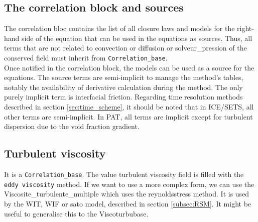 \subsection{The correlation block and sources}
The correlation bloc contains the list of all closure laws and models for the right-hand side of the equation that can be used in the equations as sources. Thus, all terms that are not related to {\color{codekeyword3} convection} or {\color{codekeyword3} diffusion} or {\color{codekeyword3} solveur_pression} of the conserved field must inherit from \texttt{Correlation_base}.\\
Once notified in the correlation block, the models can be used as a source for the equations. The source terms are semi-implicit to manage the method's tables, notably the availability of derivative calculation during the method. The only purely implicit term is interfacial friction. Regarding time resolution methods described in section \ref{sec:time_scheme}, it should be noted that in ICE/SETS, all other terms are semi-implicit. In PAT, all terms are implicit except for turbulent dispersion due to the void fraction gradient.

\subsection{Turbulent viscosity}
It is a \texttt{Correlation_base}. The value turbulent viscosity field is filled with the \texttt{eddy viscosity} method. If we want to use a more complex form, we can use the Viscosite_turbulente_multiple which uses the reynolds\textunderscore stress method. It is used by the WIT, WIF or sato model, described in section \ref{subsec:RSM}. It might be useful to generalise this to the Visco\textunderscore turbu\textunderscore base.
